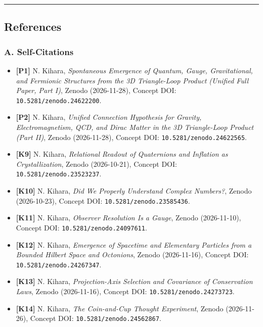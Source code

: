 \documentclass[
  a4paper,
]{article}
\providecommand{\tightlist}{%
  \setlength{\itemsep}{0pt}\setlength{\parskip}{0pt}}
\begin{document}
\begin{center}\rule{0.5\linewidth}{0.5pt}\end{center}

\subsection{References}\label{references}

\subsubsection{A. Self-Citations}\label{a.-self-citations}

\begin{itemize}
\tightlist
\item
  \textbf{{[}P1{]}} N. Kihara, \emph{Spontaneous Emergence of Quantum,
  Gauge, Gravitational, and Fermionic Structures from the 3D
  Triangle-Loop Product (Unified Full Paper, Part I)}, Zenodo
  (2026-11-28), Concept DOI: \texttt{10.5281/zenodo.24622200}.
\item
  \textbf{{[}P2{]}} N. Kihara, \emph{Unified Connection Hypothesis for
  Gravity, Electromagnetism, QCD, and Dirac Matter in the 3D
  Triangle-Loop Product (Part II)}, Zenodo (2026-11-28), Concept DOI:
  \texttt{10.5281/zenodo.24622565}.
\item
  \textbf{{[}K9{]}} N. Kihara, \emph{Relational Readout of Quaternions
  and Inflation as Crystallization}, Zenodo (2026-10-21), Concept DOI:
  \texttt{10.5281/zenodo.23523237}.
\item
  \textbf{{[}K10{]}} N. Kihara, \emph{Did We Properly Understand Complex
  Numbers?}, Zenodo (2026-10-23), Concept DOI:
  \texttt{10.5281/zenodo.23585436}.
\item
  \textbf{{[}K11{]}} N. Kihara, \emph{Observer Resolution Is a Gauge},
  Zenodo (2026-11-10), Concept DOI: \texttt{10.5281/zenodo.24097611}.
\item
  \textbf{{[}K12{]}} N. Kihara, \emph{Emergence of Spacetime and
  Elementary Particles from a Bounded Hilbert Space and Octonions},
  Zenodo (2026-11-16), Concept DOI: \texttt{10.5281/zenodo.24267347}.
\item
  \textbf{{[}K13{]}} N. Kihara, \emph{Projection-Axis Selection and
  Covariance of Conservation Laws}, Zenodo (2026-11-16), Concept DOI:
  \texttt{10.5281/zenodo.24273723}.
\item
  \textbf{{[}K14{]}} N. Kihara, \emph{The Coin-and-Cup Thought
  Experiment}, Zenodo (2026-11-26), Concept DOI:
  \texttt{10.5281/zenodo.24562867}.
\end{itemize}
\end{document}
